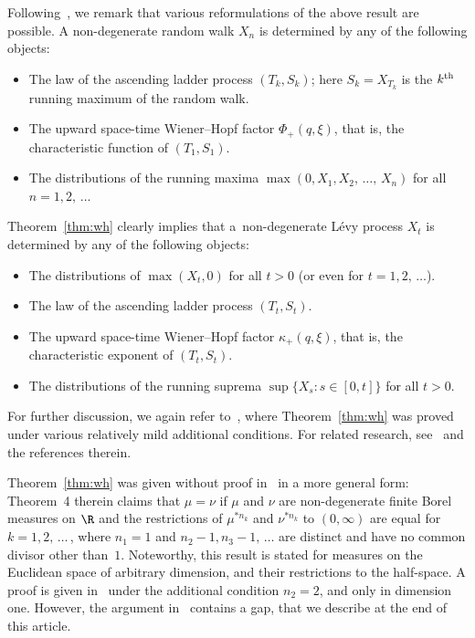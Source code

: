 Following~\cite{bib:cd17}, we remark that various reformulations of the above result are possible. A non-degenerate random walk $X_n$ is determined by any of the following objects:
\begin{itemize}
\item The law of the ascending ladder process $(T_k, S_k)$; here $S_k = X_{T_k}$ is the $k^{\rm th}$ running maximum of the random walk.
\item The upward space-time Wiener--Hopf factor $\Phi_+(q, \xi)$, that is, the characteristic function of $(T_1, S_1)$.
\item The distributions of the running maxima $\max(0, X_1, X_2,\,\ldots,\,X_n)$ for all\linebreak$n = 1, 2,\,\ldots$
\end{itemize}
Theorem~\ref{thm:wh} clearly implies that a~non-degenerate Lévy process $X_t$ is determined by any of the following objects:
\begin{itemize}
\item The distributions of $\max(X_t, 0)$ for all $t > 0$ (or even for $t = 1, 2,\,\ldots$).
\item The law of the ascending ladder process $(T_t, S_t)$.
\item The upward space-time Wiener--Hopf factor $\kappa_+(q, \xi)$, that is, the characteristic exponent of $(T_t, S_t)$.
\item The distributions of the running suprema $\sup\{X_s : s \in [0, t]\}$ for all $t > 0$.
\end{itemize}
For further discussion, we again refer to~\cite{bib:cd17}, where Theorem~\ref{thm:wh} was proved under various relatively mild additional conditions. For related research, see~\cite{bib:cd17,bib:lms76,bib:o85,bib:ou90,bib:u90,bib:u94} and the references therein.

Theorem~\ref{thm:wh} was given without proof in~\cite{bib:ou90} in a more general form: Theorem~4 therein claims that $\mu = \nu$ if $\mu$ and $\nu$ are non-degenerate finite Borel measures on $\R$ and the restrictions of $\mu^{*n_k}$ and $\nu^{*n_k}$ to $(0, \infty)$ are equal for $k = 1, 2,\,\ldots\,$, where $n_1 = 1$ and $n_2 - 1, n_3 - 1,\,\ldots$ are distinct and have no common divisor other than~$1$. Noteworthy, this result is stated for measures on the Euclidean space of arbitrary dimension, and their restrictions to the half-space. A proof is given in~\cite{bib:u94} under the additional condition $n_2 = 2$, and only in dimension one. However, the argument in~\cite{bib:u94} contains a gap, that we describe at the end of this article.


